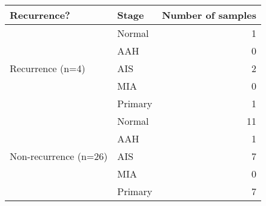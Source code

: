 \begin{tabular}{l|lr}
Recurrence? & Stage & Number of samples \\ \hline
\multirow{5}{*}{Recurrence (n=4)} & Normal & 1 \\
 & AAH & 0 \\
 & AIS & 2 \\
 & MIA & 0 \\
 & Primary & 1 \\ \hline
\multirow{5}{*}{Non-recurrence (n=26)} & Normal & 11 \\
 & AAH & 1 \\
 & AIS & 7 \\
 & MIA & 0 \\
 & Primary & 7
\end{tabular}